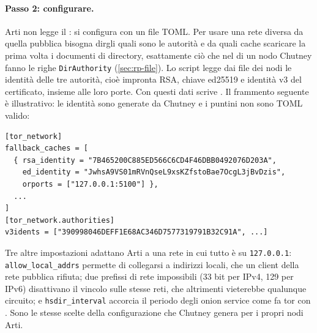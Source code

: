 \paragraph{Passo 2: configurare.} Arti non legge il : si configura con un file TOML. Per usare una rete diversa da quella pubblica bisogna dirgli quali sono le autorità e da quali cache scaricare la prima volta i documenti di directory, esattamente ciò che nel  di un nodo Chutney fanno le righe \texttt{DirAuthority} (\cref{sec:rp-file}). Lo script  legge dai file dei nodi le identità delle tre autorità, cioè impronta RSA, chiave ed25519 e identità v3 del certificato, insieme alle loro porte. Con questi dati scrive . Il frammento seguente è illustrativo: le identità sono generate da Chutney e i puntini non sono TOML valido:
\begin{lstlisting}[numbers=none]
[tor_network]
fallback_caches = [
  { rsa_identity = "7B465200C885ED566C6CD4F46DBB0492076D203A",
    ed_identity = "JwhsA9VS01mRVnQseL9xsKZfstoBae7OcgL3jBvDzis",
    orports = ["127.0.0.1:5100"] },
  ...
]
[tor_network.authorities]
v3idents = ["390998046DEFF1E68AC346D7577319791B32C91A", ...]
\end{lstlisting}
Tre altre impostazioni adattano Arti a una rete in cui tutto è su \texttt{127.0.0.1}: \texttt{allow\_local\_addrs} permette di collegarsi a indirizzi locali, che un client della rete pubblica rifiuta; due prefissi di rete impossibili (33 bit per IPv4, 129 per IPv6) disattivano il vincolo sulle stesse reti, che altrimenti vieterebbe qualunque circuito; e \texttt{hsdir\_interval} accorcia il periodo degli onion service come fa tor con . Sono le stesse scelte della configurazione che Chutney genera per i propri nodi Arti.


